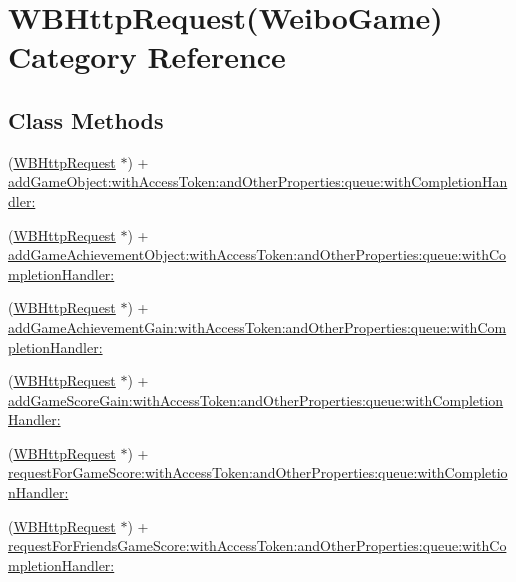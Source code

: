 \hypertarget{category_w_b_http_request_07_weibo_game_08}{}\section{W\+B\+Http\+Request(Weibo\+Game) Category Reference}
\label{category_w_b_http_request_07_weibo_game_08}
\subsection*{Class Methods}
\begin{DoxyCompactItemize}
\item 
(\mbox{\hyperlink{interface_w_b_http_request}{W\+B\+Http\+Request}} $\ast$) + \mbox{\hyperlink{category_w_b_http_request_07_weibo_game_08_ae85dddcb52426ccf3105aecd613c25f1}{add\+Game\+Object\+:with\+Access\+Token\+:and\+Other\+Properties\+:queue\+:with\+Completion\+Handler\+:}}
\item 
(\mbox{\hyperlink{interface_w_b_http_request}{W\+B\+Http\+Request}} $\ast$) + \mbox{\hyperlink{category_w_b_http_request_07_weibo_game_08_a3e9ccee69346b4924f899ce4127e6c24}{add\+Game\+Achievement\+Object\+:with\+Access\+Token\+:and\+Other\+Properties\+:queue\+:with\+Completion\+Handler\+:}}
\item 
(\mbox{\hyperlink{interface_w_b_http_request}{W\+B\+Http\+Request}} $\ast$) + \mbox{\hyperlink{category_w_b_http_request_07_weibo_game_08_a49f7163ca8362f339d37df2b93e36d06}{add\+Game\+Achievement\+Gain\+:with\+Access\+Token\+:and\+Other\+Properties\+:queue\+:with\+Completion\+Handler\+:}}
\item 
(\mbox{\hyperlink{interface_w_b_http_request}{W\+B\+Http\+Request}} $\ast$) + \mbox{\hyperlink{category_w_b_http_request_07_weibo_game_08_a267d11cd3679a39fa49e42efaa9bf301}{add\+Game\+Score\+Gain\+:with\+Access\+Token\+:and\+Other\+Properties\+:queue\+:with\+Completion\+Handler\+:}}
\item 
(\mbox{\hyperlink{interface_w_b_http_request}{W\+B\+Http\+Request}} $\ast$) + \mbox{\hyperlink{category_w_b_http_request_07_weibo_game_08_aebf781874099f199819a90a1f83f06d5}{request\+For\+Game\+Score\+:with\+Access\+Token\+:and\+Other\+Properties\+:queue\+:with\+Completion\+Handler\+:}}
\item 
(\mbox{\hyperlink{interface_w_b_http_request}{W\+B\+Http\+Request}} $\ast$) + \mbox{\hyperlink{category_w_b_http_request_07_weibo_game_08_a07bfa63c702e8a920513d8b0accaf693}{request\+For\+Friends\+Game\+Score\+:with\+Access\+Token\+:and\+Other\+Properties\+:queue\+:with\+Completion\+Handler\+:}}

\end{DoxyCompactItemize}
